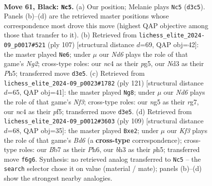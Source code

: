 \documentclass[11pt]{article}
\begin{document}
\clearpage

\begin{figure}[p]\centering
\begin{subfigure}{0.46\textwidth}\centering
\resizebox{\linewidth}{!}{%
\newchessgame
\chessboard[
  setfen={8/Pb6/5k2/6N1/1pN2P2/1PnnK1PB/7P/R7 b - - 4 61},
  showmover=false,
  pgfstyle=straightmove, color=movearrow, markmove={d3-c5}
]}
\caption{}
\end{subfigure}\hfill
\begin{subfigure}{0.46\textwidth}\centering
\resizebox{\linewidth}{!}{%
\newchessgame
\chessboard[
  setfen={8/6n1/2N3K1/pP1k2Pp/P4p1P/1N3P2/1b6/8 b - - 2 54},
  showmover=false,
  pgfstyle=straightmove, color=movearrow, markmove={g7-e6}
]}
\caption{}
\end{subfigure}
\\[4pt]
\begin{subfigure}{0.46\textwidth}\centering
\resizebox{\linewidth}{!}{%
\newchessgame
\chessboard[
  setfen={2r2k2/6R1/1pN2n1P/1P3PKP/p7/P7/1P6/8 b - - 8 61},
  showmover=false,
  pgfstyle=straightmove, color=movearrow, markmove={f6-g8}
]}
\caption{}
\end{subfigure}\hfill
\begin{subfigure}{0.46\textwidth}\centering
\resizebox{\linewidth}{!}{%
\newchessgame
\chessboard[
  setfen={8/4k3/3n3p/p1KP3P/P4P2/1pNb4/1P2B3/8 b - - 4 55},
  showmover=false,
  pgfstyle=straightmove, color=movearrow, markmove={d3-e2}
]}
\caption{}
\end{subfigure}
\caption{\textbf{Move 61, Black: \texttt{Nc5}.} (a) Our position; Melanie plays \texttt{Nc5} (\texttt{d3c5}). Panels (b)--(d) are the retrieved master positions whose correspondence most drove this move (highest QAP objective among those that transfer to it). (b) Retrieved from \texttt{lichess\_elite\_2024-09\_p0017\#521} (ply 107) [structural distance $d$=69, QAP obj=42]: the master played \texttt{Ne6}; under $\mu$ our \emph{Nd6} plays the role of that game's \emph{Ng2}; cross-type roles: our \emph{n}c4 as their \emph{p}g5, our \emph{N}d3 as their \emph{P}h5; transferred move \texttt{d3e5}. (c) Retrieved from \texttt{lichess\_elite\_2024-09\_p0023\#1782} (ply 121) [structural distance $d$=65, QAP obj=41]: the master played \texttt{Ng8}; under $\mu$ our \emph{Nd6} plays the role of that game's \emph{Nf3}; cross-type roles: our \emph{n}g5 as their \emph{r}g7, our \emph{n}c4 as their \emph{p}f5; transferred move \texttt{d3e5}. (d) Retrieved from \texttt{lichess\_elite\_2024-09\_p0012\#3603} (ply 109) [structural distance $d$=68, QAP obj=35]: the master played \texttt{Bxe2}; under $\mu$ our \emph{Kf3} plays the role of that game's \emph{Bd6} (a \textbf{cross-type} correspondence); cross-type roles: our \emph{B}b7 as their \emph{P}h6, our \emph{b}h3 as their \emph{p}h5; transferred move \texttt{f6g6}. Synthesis: no retrieved analog transferred to \texttt{Nc5} -- the \texttt{search} selector chose it on value (material / mate); panels (b)--(d) show the strongest nearby analogies.}
\label{fig:thought-m121}
\end{figure}
\end{document}
